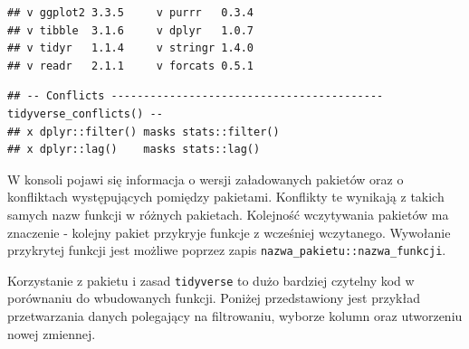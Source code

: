 \documentclass[
]{book}
\newenvironment{Shaded}{\begin{snugshade}}{\end{snugshade}}
\newcommand{\AttributeTok}[1]{\textcolor[rgb]{0.77,0.63,0.00}{#1}}
\newcommand{\CommentTok}[1]{\textcolor[rgb]{0.56,0.35,0.01}{\textit{#1}}}
\newcommand{\DecValTok}[1]{\textcolor[rgb]{0.00,0.00,0.81}{#1}}
\newcommand{\FunctionTok}[1]{\textcolor[rgb]{0.00,0.00,0.00}{#1}}
\newcommand{\NormalTok}[1]{#1}
\newcommand{\OtherTok}[1]{\textcolor[rgb]{0.56,0.35,0.01}{#1}}
\newcommand{\SpecialCharTok}[1]{\textcolor[rgb]{0.00,0.00,0.00}{#1}}
\newcommand{\StringTok}[1]{\textcolor[rgb]{0.31,0.60,0.02}{#1}}
\begin{document}
\begin{verbatim}
## v ggplot2 3.3.5     v purrr   0.3.4
## v tibble  3.1.6     v dplyr   1.0.7
## v tidyr   1.1.4     v stringr 1.4.0
## v readr   2.1.1     v forcats 0.5.1
\end{verbatim}

\begin{verbatim}
## -- Conflicts ------------------------------------------ tidyverse_conflicts() --
## x dplyr::filter() masks stats::filter()
## x dplyr::lag()    masks stats::lag()
\end{verbatim}

W konsoli pojawi się informacja o wersji załadowanych pakietów oraz o konfliktach występujących pomiędzy pakietami. Konflikty te wynikają z takich samych nazw funkcji w różnych pakietach. Kolejność wczytywania pakietów ma znaczenie - kolejny pakiet przykryje funkcje z wcześniej wczytanego. Wywołanie przykrytej funkcji jest możliwe poprzez zapis \texttt{nazwa\_pakietu::nazwa\_funkcji}.

Korzystanie z pakietu i zasad \texttt{tidyverse} to dużo bardziej czytelny kod w porównaniu do wbudowanych funkcji. Poniżej przedstawiony jest przykład przetwarzania danych polegający na filtrowaniu, wyborze kolumn oraz utworzeniu nowej zmiennej.

\begin{Shaded}
\end{Shaded}
\end{document}
